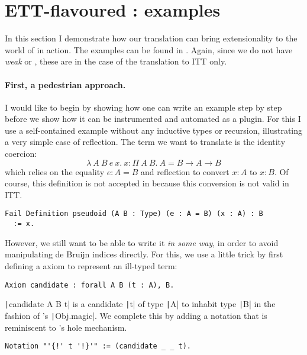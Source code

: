 \section{ETT-flavoured \Coq: examples}

In this section I demonstrate how our translation can bring extensionality to
the world of \Coq in action. The examples can be found in
.
Again, since we do not have \emph{weak} \Coq or \MetaCoq, these are in the case
of the translation to \acrshort{ITT} only.

\paragraph{First, a pedestrian approach.}
%
I would like to begin by showing how one can write an example step by step
before we show how it can be instrumented and automated as a plugin.
For this I use a self-contained example without any inductive
types or recursion, illustrating a very simple case of reflection.
The term we want to translate is the identity coercion:
\[
  \lambda\ A\ B\ e\ x.\ x : \Pi\ A\ B.\ A = B \to
  A \to B
\]
which relies on the equality \(e : A = B\) and reflection to convert  \(x : A\)
to \(x : B\).
%
Of course, this definition is not accepted in \Coq because this
conversion is not valid in \acrshort{ITT}.
%
\begin{verbatim}
Fail Definition pseudoid (A B : Type) (e : A = B) (x : A) : B
  := x.
\end{verbatim}
%
However, we still want to be able to write it \emph{in some way}, in order to
avoid manipulating de Bruijn indices directly.
%
For this, we use a little trick by first defining a \Coq axiom to represent
an ill-typed term:
%
\begin{verbatim}
Axiom candidate : forall A B (t : A), B.
\end{verbatim}
%
\texttt|candidate A B t| is a candidate \texttt|t| of type
\texttt|A| to inhabit type \texttt|B| in the fashion of
\ocaml's \texttt|Obj.magic|.
We complete this by adding a notation that is reminiscent to \Agda's hole
mechanism.
%
\begin{verbatim}
Notation "'{!' t '!}'" := (candidate _ _ t).
\end{verbatim}

